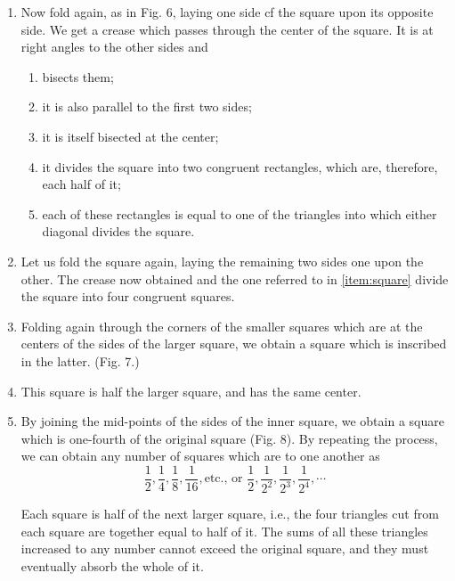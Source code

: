 \begin{enumerate}
    \item \label{item:square} Now fold again, as in Fig. 6, laying one side cf
        the square upon its opposite side. We get a crease which passes through
        the center of the square. It is at right angles to the other sides and 

    \begin{enumerate}[(1)]
        \item bisects them; 
        \item it is also parallel to the first two sides; 
        \item it is itself bisected at the center; 
        \item it divides the square into two congruent rectangles, which are,
            therefore, each half of it; 
        \item each of these rectangles is equal to one of the triangles into 
            which either diagonal divides the square.
    \end{enumerate}

    \item Let us fold the square again, laying the remaining two sides one upon
        the other. The crease now obtained and the one referred to in
        \ref{item:square} divide the square into four congruent squares.
    
    \item Folding again through the corners of the smaller squares which are at
        the centers of the sides of the larger square, we obtain a square which
        is inscribed in the latter. (Fig. 7.)
    
    \item This square is half the larger square, and has the same center.
    
    \item By joining the mid-points of the sides of the inner square, we obtain
        a square which is one-fourth of the original square (Fig. 8). By
        repeating the process, we can obtain any number of squares which are to
        one another as $$\frac{1}{2},  \frac{1}{4}, \frac{1}{8},
        \frac{1}{16}, \text{etc., or } \frac{1}{2}, \frac{1}{2^2},
        \frac{1}{2^3}, \frac{1}{2^4}, \cdots$$

        Each square is half of the next larger square, i.e., the four triangles
        cut from each square are together equal to half of it. The sums of all
        these triangles increased to any number cannot exceed the original
        square, and they must eventually absorb the whole of it.


\end{enumerate}
